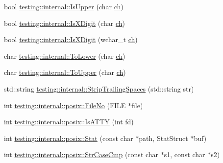 \begin{DoxyCompactItemize}
\item 
bool \mbox{\hyperlink{namespacetesting_1_1internal_a84f3baa379fec6bf5947cb5165aa8cc9}{testing\+::internal\+::\+Is\+Upper}} (char \mbox{\hyperlink{_obj__test_2lib_2googletest-master_2googlemock_2test_2gmock-matchers__test_8cc_af53f92900705f7de3c139a05b2f9ef16}{ch}})
\item 
bool \mbox{\hyperlink{namespacetesting_1_1internal_aa234ef141278263fb143b616c74c86e7}{testing\+::internal\+::\+Is\+X\+Digit}} (char \mbox{\hyperlink{_obj__test_2lib_2googletest-master_2googlemock_2test_2gmock-matchers__test_8cc_af53f92900705f7de3c139a05b2f9ef16}{ch}})
\item 
bool \mbox{\hyperlink{namespacetesting_1_1internal_a6ab68a30f8291c09b2289c132bbe3b16}{testing\+::internal\+::\+Is\+X\+Digit}} (wchar\+\_\+t \mbox{\hyperlink{_obj__test_2lib_2googletest-master_2googlemock_2test_2gmock-matchers__test_8cc_af53f92900705f7de3c139a05b2f9ef16}{ch}})
\item 
char \mbox{\hyperlink{namespacetesting_1_1internal_ad9c627ef2a94245e3fd69e7ab3d49b42}{testing\+::internal\+::\+To\+Lower}} (char \mbox{\hyperlink{_obj__test_2lib_2googletest-master_2googlemock_2test_2gmock-matchers__test_8cc_af53f92900705f7de3c139a05b2f9ef16}{ch}})
\item 
char \mbox{\hyperlink{namespacetesting_1_1internal_ac1b876a8133895bd553d4780ecaa1e3a}{testing\+::internal\+::\+To\+Upper}} (char \mbox{\hyperlink{_obj__test_2lib_2googletest-master_2googlemock_2test_2gmock-matchers__test_8cc_af53f92900705f7de3c139a05b2f9ef16}{ch}})
\item 
std\+::string \mbox{\hyperlink{namespacetesting_1_1internal_aa6afda12e567c353e2e9b9c2e8cae14f}{testing\+::internal\+::\+Strip\+Trailing\+Spaces}} (std\+::string str)
\item 
int \mbox{\hyperlink{namespacetesting_1_1internal_1_1posix_a3117b067e1f942a2031e666953120ccc}{testing\+::internal\+::posix\+::\+File\+No}} (F\+I\+LE $\ast$file)
\item 
int \mbox{\hyperlink{namespacetesting_1_1internal_1_1posix_a16ebe936b3a8ea462a94191635aedc27}{testing\+::internal\+::posix\+::\+Is\+A\+T\+TY}} (int fd)
\item 
int \mbox{\hyperlink{namespacetesting_1_1internal_1_1posix_a2b87b7ff647a128614daf50667eb9304}{testing\+::internal\+::posix\+::\+Stat}} (const char $\ast$path, Stat\+Struct $\ast$buf)
\item 
int \mbox{\hyperlink{namespacetesting_1_1internal_1_1posix_a1ef2385a7f8e4c706054da35967e76bd}{testing\+::internal\+::posix\+::\+Str\+Case\+Cmp}} (const char $\ast$s1, const char $\ast$s2)

\end{DoxyCompactItemize}
